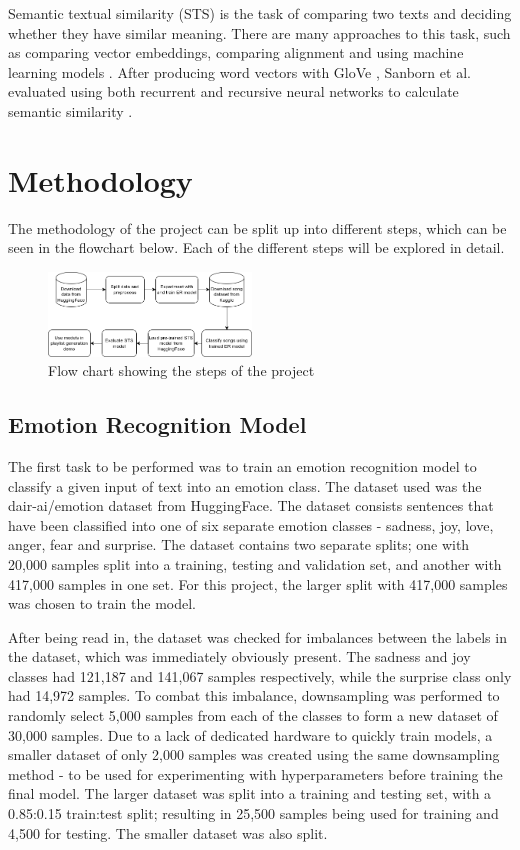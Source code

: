 \documentclass[11pt]{article}
\begin{document}
Semantic textual similarity (STS) is the task of comparing two texts and deciding whether they have similar meaning. There are many approaches to this task, such as comparing vector embeddings, comparing alignment and using machine learning models \cite{semanticTextSimilarity}. After producing word vectors with GloVe \cite{pennington-etal-2014-glove}, Sanborn et al. evaluated using both recurrent and recursive neural networks to calculate semantic similarity \cite{Sanborn2015DeepLF}.

\section{Methodology}
The methodology of the project can be split up into different steps, which can be seen in the flowchart below. Each of the different steps will be explored in detail.

\begin{figure}[H]
    \centering
    \includegraphics[width=0.48\textwidth]{images/codeFlow.png}
    \caption{Flow chart showing the steps of the project}
\end{figure}

\subsection{Emotion Recognition Model}
The first task to be performed was to train an emotion recognition model to classify a given input of text into an emotion class. The dataset used was the dair-ai/emotion dataset \cite{emotiondata} from HuggingFace. The dataset consists sentences that have been classified into one of six separate emotion classes - sadness, joy, love, anger, fear and surprise. The dataset contains two separate splits; one with 20,000 samples split into a training, testing and validation set, and another with 417,000 samples in one set. For this project, the larger split with 417,000 samples was chosen to train the model.

After being read in, the dataset was checked for imbalances between the labels in the dataset, which was immediately obviously present. The sadness and joy classes had 121,187 and 141,067 samples respectively, while the surprise class only had 14,972 samples. To combat this imbalance, downsampling was performed to randomly select 5,000 samples from each of the classes to form a new dataset of 30,000 samples. Due to a lack of dedicated hardware to quickly train models, a smaller dataset of only 2,000 samples was created using the same downsampling method - to be used for experimenting with hyperparameters before training the final model. The larger dataset was split into a training and testing set, with a 0.85:0.15 train:test split; resulting in 25,500 samples being used for training and 4,500 for testing. The smaller dataset was also split.
\end{document}
